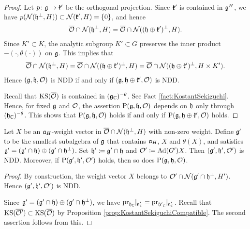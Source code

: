 \begin{proof}
	Let $p \colon \mathfrak{g} \rightarrow \mathfrak{k'}$ be the orthogonal projection.
	Since $\mathfrak{k'}$ is contained in $\mathfrak{g}^H$, we have $p(\mathcal{N}(\mathfrak{h}^\perp, H)) \subset \mathcal{N}(\mathfrak{k'}, H) = \left\{0 \right\}$, and hence
	\begin{align*}
		\overline{\mathcal{O}} \cap \mathcal{N}(\mathfrak{h}^\perp, H) = \overline{\mathcal{O}} \cap \mathcal{N}((\mathfrak{h} \oplus \mathfrak{k'})^\perp, H).
	\end{align*}
	Since $K' \subset K$, the analytic subgroup $K' \subset G$ preserves the inner product $-(\cdot, \theta(\cdot))$ on $\mathfrak{g}$.
	This implies that 
	\begin{align*}
		\overline{\mathcal{O}} \cap \mathcal{N}(\mathfrak{h}^\perp, H) = \overline{\mathcal{O}} \cap \mathcal{N}((\mathfrak{h} \oplus \mathfrak{k'})^\perp, H) = \overline{\mathcal{O}} \cap \mathcal{N}((\mathfrak{h} \oplus \mathfrak{k'})^\perp, H\times K').
	\end{align*}
	Hence $(\mathfrak{g}, \mathfrak{h}, \mathcal{O})$ is NDD if and only if $(\mathfrak{g}, \mathfrak{h} \oplus \mathfrak{k'}, \mathcal{O})$ is NDD.

	Recall that $\mathrm{KS}(\overline{\mathcal{O}})$ is contained in $(\mathfrak{g}_{\mathbb{C}})^{-\theta}$.
	See Fact \ref{fact:KostantSekiguchi}.
	Hence, for fixed $\mathfrak{g}$ and $\mathcal{O}$, the assertion $\mathrm{P}(\mathfrak{g}, \mathfrak{h}, \mathcal{O})$ depends on $\mathfrak{h}$ only through $(\mathfrak{h}_{\mathbb{C}})^{-\theta}$.
	This shows that $\mathrm{P}(\mathfrak{g}, \mathfrak{h}, \mathcal{O})$ holds if and only if $\mathrm{P}(\mathfrak{g}, \mathfrak{h} \oplus \mathfrak{k'}, \mathcal{O})$ holds.
\end{proof}

\begin{lemma} \label{lem:ReductionNilpotent}
	Let $X$ be an $\mathfrak{a}_H$-weight vector in $\overline{\mathcal{O}} \cap \mathcal{N}(\mathfrak{h}^\perp, H)$ with non-zero weight.
	Define $\mathfrak{g'}$ to be the smallest subalgebra of $\mathfrak{g}$ that contains $\mathfrak{a}_H$, $X$ and $\theta(X)$, and satisfies $\mathfrak{g'} = (\mathfrak{g'}\cap \mathfrak{h}) \oplus (\mathfrak{g'}\cap \mathfrak{h}^\perp)$.
	Set $\mathfrak{h'} \coloneq \mathfrak{g'} \cap \mathfrak{h}$ and $\mathcal{O}' \coloneq \mathrm{Ad}(G')X$.
	Then $(\mathfrak{g'}, \mathfrak{h'}, \mathcal{O}')$ is NDD.
	Moreover, if $\mathrm{P}(\mathfrak{g}', \mathfrak{h}', \mathcal{O}')$ holds, then so does $\mathrm{P}(\mathfrak{g}, \mathfrak{h}, \mathcal{O})$.
\end{lemma}

\begin{proof}
	By construction, the weight vector $X$ belongs to $\mathcal{O}'\cap \mathcal{N}(\mathfrak{g'}\cap \mathfrak{h}^\perp, H')$.
	Hence $(\mathfrak{g'}, \mathfrak{h'}, \mathcal{O}')$ is NDD.
	
	Since $\mathfrak{g'} = (\mathfrak{g'}\cap \mathfrak{h}) \oplus (\mathfrak{g'}\cap \mathfrak{h}^\perp)$, we have $\mathrm{pr}_{\mathfrak{h}_{\mathbb{C}}}|_{\mathfrak{g}_{\mathbb{C}}'} = \mathrm{pr}_{\mathfrak{h'}_{\mathbb{C}}}|_{\mathfrak{g}_{\mathbb{C}}'}$. Recall that $\mathrm{KS}(\overline{\mathcal{O}'}) \subset \mathrm{KS}(\overline{\mathcal{O}})$ by Proposition \ref{prop:KostantSekiguchiCompatible}.
	The second assertion follows from this.
\end{proof}


